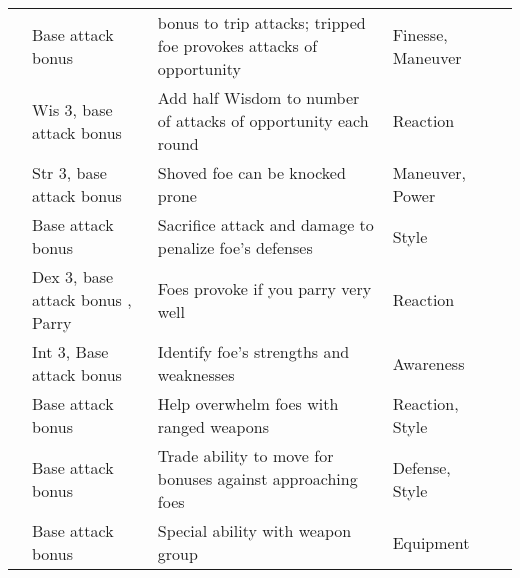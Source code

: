 {\begin{longtabu}{>{\lcol}p{10em} >{\lcol}p{15em} >{\lcol}X >{\lcol}p{6em} >{\lcol}p{3em}}
         & Base attack bonus  &  bonus to trip attacks; tripped foe provokes attacks of opportunity & Finesse, Maneuver &  \\
         & Wis 3, base attack bonus  & Add half Wisdom to number of attacks of opportunity each round & Reaction &  \\
         & Str 3, base attack bonus  & Shoved foe can be knocked prone & Maneuver, Power &  \\
         & Base attack bonus  & Sacrifice attack and damage to penalize foe's defenses & Style &  \\
         & Dex 3, base attack bonus , Parry & Foes provoke if you parry very well & Reaction &  \\
         & Int 3, Base attack bonus  & Identify foe's strengths and weaknesses & Awareness &  \\
         & Base attack bonus  & Help overwhelm foes with ranged weapons & Reaction, Style &  \\
         & Base attack bonus  & Trade ability to move for bonuses against approaching foes & Defense, Style &  \\
         & Base attack bonus  & Special ability with weapon group & Equipment &  \\


\end{longtabu}}
